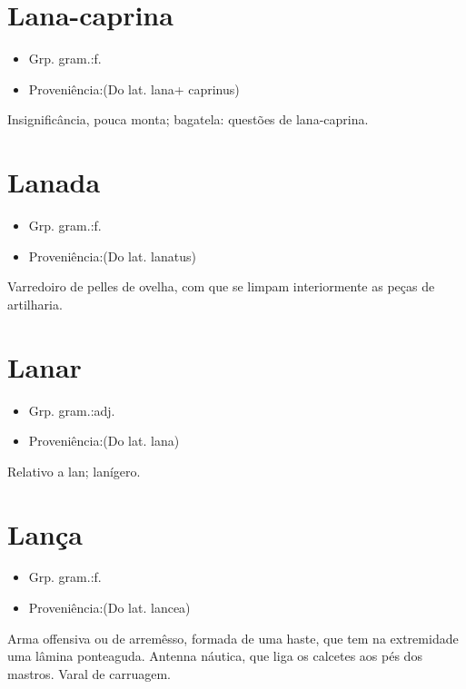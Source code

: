 \section{Lana-caprina}
\begin{itemize}
\item {Grp. gram.:f.}
\end{itemize}
\begin{itemize}
\item {Proveniência:(Do lat. \textunderscore lana\textunderscore  + \textunderscore caprinus\textunderscore )}
\end{itemize}
Insignificância, pouca monta; bagatela: \textunderscore questões de lana-caprina\textunderscore .
\section{Lanada}
\begin{itemize}
\item {Grp. gram.:f.}
\end{itemize}
\begin{itemize}
\item {Proveniência:(Do lat. \textunderscore lanatus\textunderscore )}
\end{itemize}
Varredoiro de pelles de ovelha, com que se limpam interiormente as peças de artilharia.
\section{Lanar}
\begin{itemize}
\item {Grp. gram.:adj.}
\end{itemize}
\begin{itemize}
\item {Proveniência:(Do lat. \textunderscore lana\textunderscore )}
\end{itemize}
Relativo a lan; lanígero.
\section{Lança}
\begin{itemize}
\item {Grp. gram.:f.}
\end{itemize}
\begin{itemize}
\item {Proveniência:(Do lat. \textunderscore lancea\textunderscore )}
\end{itemize}
Arma offensiva ou de arremêsso, formada de uma haste, que tem na extremidade uma lâmina ponteaguda.
Antenna náutica, que liga os calcetes aos pés dos mastros.
Varal de carruagem.
